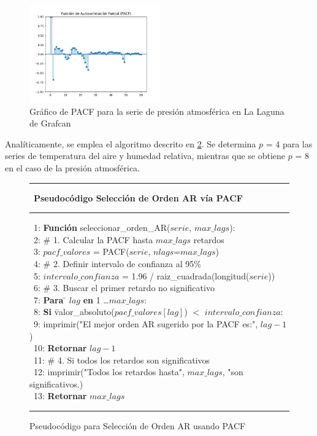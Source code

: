 \begin{figure}[H]
    \centering
    \includegraphics[width=0.5\textwidth]{images/arima_pacf_pres.png}
    \caption{Gráfico de PACF para la serie de presión atmosférica en La Laguna de Grafcan}
    \label{arima_pacf_pres}
\end{figure}


Analíticamente, se emplea el algoritmo descrito en \ref{pacf_ar_order}. Se determina $p$ = 4 para las series de temperatura del aire y humedad relativa, mientras 
que se obtiene $p$ = 8 en el caso de la presión atmosférica.

\begin{figure}[H]
    {\small
    \hrule \
    {\bf\small Pseudocódigo Selección de Orden AR vía PACF}
    \hrule
    \begin{center}
    \begin{tabbing}
    \ 1: {\bf Fun}\={\bf ción} seleccionar\_orden\_AR($serie$, $max\_lags$): \\
    \ 2: \> \# 1. Calcular la PACF hasta $max\_lags$ retardos \\
    \ 3: \> $pacf\_valores$ = PACF($serie$, $nlags$=$max\_lags$) \\
    \ 4: \> \# 2. Definir intervalo de confianza al 95\% \\
    \ 5: \> $intervalo\_confianza$ = 1.96 / raiz\_cuadrada(longitud($serie$)) \\
    \ 6: \> \# 3. Buscar el primer retardo no significativo \\
    \ 7: \> {\bf Para} \= $lag$ {\bf en} 1 \dots $max\_lags$: \\
    \ 8: \> \> {\bf Si} \= valor\_absoluto($pacf\_valores[lag]$) $<$ $intervalo\_confianza$: \\
    \ 9: \> \> \> imprimir("El mejor orden AR sugerido por la PACF es:", $lag-1$) \\
    \ 10: \> \> \> {\bf Retornar} $lag-1$ \\
    \ 11: \> \# 4. Si todos los retardos son significativos \\
    \ 12: \> imprimir("Todos los retardos hasta", $max\_lags$, "son significativos.) \\
    \ 13: \> {\bf Retornar} $max\_lags$ \\
    \end{tabbing}
    \end{center}
    \hrule
    }
    \caption{Pseudocódigo para Selección de Orden AR usando PACF}
    \label{pacf_ar_order}
\end{figure}

